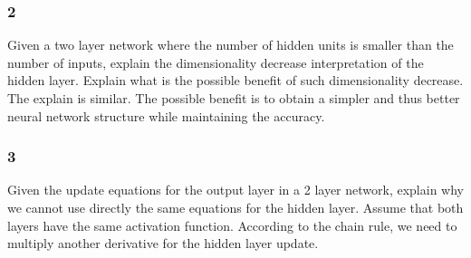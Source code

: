 \documentclass{article}
\begin{document}
\subsubsection*{2}
\begin{myleftlinebox}
    Given a two layer network where the number of hidden units is smaller than the number of inputs, explain the dimensionality decrease interpretation of the hidden layer. Explain what is the possible benefit of such dimensionality decrease.
    \tcblower
    The explain is similar. The possible benefit is to obtain a simpler and thus better neural network structure while maintaining the accuracy.
\end{myleftlinebox}

\subsubsection*{3}
\begin{myleftlinebox}
    Given the update equations for the output layer in a 2 layer network, explain why we cannot use directly the same equations for the hidden layer. Assume that both layers have the same activation function.
    \tcbline
    According to the chain rule, we need to multiply another derivative for the hidden layer update.
\end{myleftlinebox}
\end{document}
